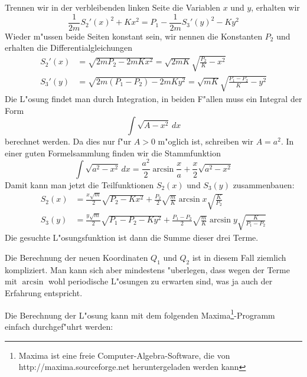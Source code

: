 \begin{loesung}
Trennen wir in der verbleibenden linken Seite die Variablen $x$ und $y$,
erhalten wir
\[
\frac1{2m}S_2'(x)^2+Kx^2
=
P_1-
\frac1{2m}S_3'(y)^2-Ky^2
\]
Wieder m"ussen beide Seiten konstant sein, wir nennen die Konstanten $P_2$
und erhalten die Differentialgleichungen
\begin{align*}
S_2'(x)&=\sqrt{2mP_2-2mKx^2}=\sqrt{2mK}\sqrt{\frac{P_2}{K}-x^2}\\
S_3'(y)&=\sqrt{2m(P_1-P_2)-2mKy^2}=\sqrt{mK}\sqrt{\frac{P_1-P_2}{K}-y^2}
\end{align*}
Die L"osung findet man durch Integration, in beiden F"allen muss ein 
Integral der Form
\[
\int \sqrt{A-x^2}\,dx
\]
berechnet werden.
Da dies nur f"ur $A>0$ m"oglich ist, schreiben wir $A=a^2$.
In einer guten Formelsammlung finden wir die Stammfunktion
\[
\int\sqrt{a^2-x^2}\,dx
=
\frac{a^2}2\arcsin\frac{x}{a}+\frac{x}2\sqrt{a^2-x^2}
\]
Damit kann man jetzt die Teilfunktionen $S_2(x)$ und $S_3(y)$
zusammenbauen:
\begin{align*}
S_2(x)
&=
\frac{x\sqrt{m}}2\sqrt{P_2-Kx^2}
+
\frac{P_2}{2}\sqrt{\frac{m}{K}}\arcsin x\sqrt{\frac{K}{P_2}}
\\
S_3(y)
&=
\frac{y\sqrt{m}}2\sqrt{P_1-P_2-Ky^2}
+
\frac{P_1-P_2}2 \sqrt{\frac{m}{K}}\arcsin y\sqrt{\frac{K}{P_1-P_2}}
\end{align*}
Die gesuchte L"osungsfunktion ist dann die Summe dieser drei Terme.
\end{loesung}

\begin{diskussion}
Die Berechnung der neuen Koordinaten $Q_1$ und $Q_2$ ist in diesem
Fall ziemlich kompliziert. Man kann sich aber mindestens "uberlegen,
dass wegen der Terme mit $\arcsin$ wohl periodische L"osungen zu
erwarten sind, was ja auch der Erfahrung entspricht.

Die Berechnung der L"osung kann mit dem folgenden Maxima\footnote{Maxima
ist eine freie Computer-Algebra-Software, die von
http://maxima.sourceforge.net heruntergeladen werden kann}-Programm
einfach durchgef"uhrt werden:
\end{diskussion}
